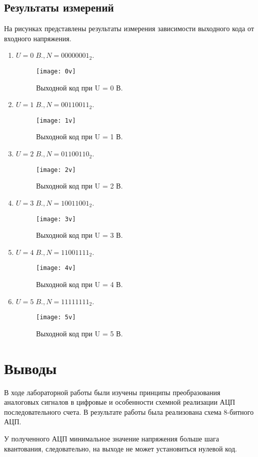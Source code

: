 \documentclass[a4paper,14pt]{extarticle}
\begin{document}
\subsection{Результаты измерений}
На рисунках представлены результаты измерения зависимости выходного
кода от входного напряжения.
\begin{enumerate}
    \item $U = 0 \; B., N = 00000001_{2}$.
        \begin{figure}[H]
            \centering
            \texttt{[image: 0v]}
            \caption{Выходной код при U = 0 В.}
            \label{fig:0v}
        \end{figure}
    \item $U = 1 \; B., N = 00110011_{2}$.
        \begin{figure}[H]
            \centering
            \texttt{[image: 1v]}
            \caption{Выходной код при U = 1 В.}
            \label{fig:1v}
        \end{figure}
    \item $U = 2 \; B., N = 01100110_{2}$.
        \begin{figure}[H]
            \centering
            \texttt{[image: 2v]}
            \caption{Выходной код при U = 2 В.}
            \label{fig:2v}
        \end{figure}
        \pagebreak
    \item $U = 3 \; B., N = 10011001_{2}$.
        \begin{figure}[H]
            \centering
            \texttt{[image: 3v]}
            \caption{Выходной код при U = 3 В.}
            \label{fig:3v}
        \end{figure}
    \item $U = 4 \; B., N = 11001111_{2}$.
        \begin{figure}[H]
            \centering
            \texttt{[image: 4v]}
            \caption{Выходной код при U = 4 В.}
            \label{fig:4v}
        \end{figure}
    \item $U = 5 \; B., N = 11111111_{2}$.
        \begin{figure}[H]
            \centering
            \texttt{[image: 5v]}
            \caption{Выходной код при U = 5 В.}
            \label{fig:5v}
        \end{figure}
\end{enumerate}
\section*{Выводы}
В ходе лабораторной работы были изучены принципы преобразования аналоговых
сигналов в цифровые и особенности схемной реализации АЦП последовательного
счета. В результате работы была реализована схема 8-битного АЦП.

У полученного АЦП минимальное значение напряжения больше шага квантования,
следовательно, на выходе не может установиться нулевой код.
\end{document}
